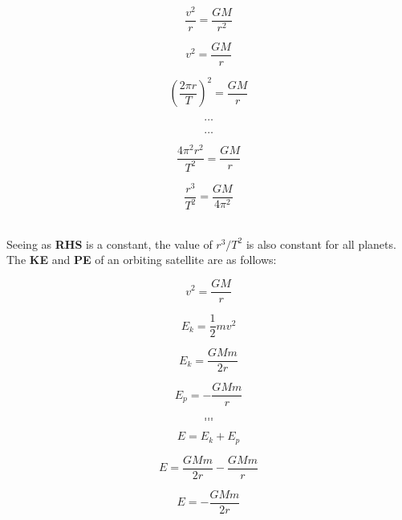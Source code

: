 \documentclass[12pt]{article}
\begin{document}
\begin{figure}[H]
\centering
\begin{minipage}{.8\textwidth}
\begin{tcolorbox}[
sharp corners=all,
colback=white,
colframe=white,
size=tight,
boxrule=0.2mm,
left=10mm, right=10mm,
]
\begin{multicols}{2}
\noindent
\\
\[\dfrac{v^2}{r} = \dfrac{GM}{r^2}\]

\[v^2 = \dfrac{GM}{r}\]

\[\left (\dfrac{2 \pi r}{T} \right )^2 = \dfrac{GM}{r}\]

\[\textbf{\ldots}\]
\columnbreak

\[\textbf{\ldots}\]

\[\dfrac{4 \pi^2 r^2}{T^2} = \dfrac{GM}{r}\]

\[\dfrac{r^3}{T^2} = \dfrac{GM}{4 \pi^2 }\]
\\

\end{multicols}
\end{tcolorbox}
\end{minipage}
\end{figure}

Seeing as \textbf{RHS} is a constant, the value of \(r^3/T^2\) is also constant for all planets. The \textbf{KE} and \textbf{PE} of an orbiting satellite are as follows:

\vspace{5mm}
\begin{figure}[H]
\centering
\begin{minipage}{.8\textwidth}
\begin{tcolorbox}[
sharp corners=all,
colback=white,
colframe=white,
size=tight,
boxrule=0.2mm,
left=10mm, right=10mm,
]
\begin{multicols}{2}
\noindent
\[v^2 = \dfrac{GM}{r}\]

\[E_k = \dfrac{1}{2} m v^2\]

\[E_k = \dfrac{GMm}{2r}\]

\[E_p = -\dfrac{GMm}{r}\]

\[\textbf{\ldots}\]
\columnbreak
\[\textbf{\ldots}\]

\[ E = E_k + E_p\]

\[E = \dfrac{GMm}{2r} -\dfrac{GMm}{r} \]

\[E =-\dfrac{GMm}{2r} \]
\\

\end{multicols}
\end{tcolorbox}
\end{minipage}
\end{figure}
\end{document}
